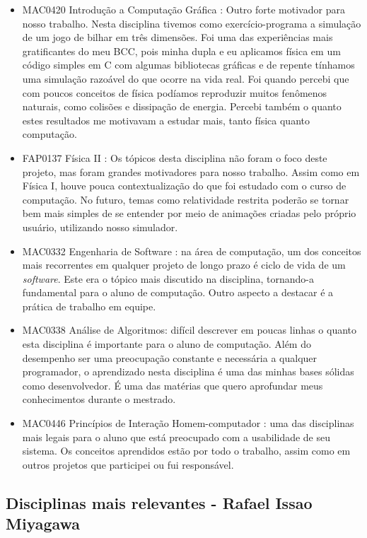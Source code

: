 \begin{itemize}
\item MAC0420 	Introdução a Computação Gráfica : Outro forte motivador para nosso trabalho. Nesta disciplina tivemos como exercício-programa a simulação de um jogo de bilhar em três dimensões. Foi uma das experiências mais gratificantes do meu BCC, pois minha dupla e eu aplicamos física em um código simples em C com algumas bibliotecas gráficas e de repente tínhamos uma simulação razoável do que ocorre na vida real. Foi quando percebi que com poucos conceitos de física podíamos reproduzir muitos fenômenos naturais, como colisões e dissipação de energia. Percebi também o quanto estes resultados me motivavam a estudar mais, tanto física quanto computação.

\item FAP0137 	Física II : Os tópicos desta disciplina não foram o foco deste projeto, mas foram grandes motivadores para nosso trabalho. Assim como em Física I, houve pouca contextualização do que foi estudado com o curso de computação. No futuro, temas como relatividade restrita poderão se tornar bem mais simples de se entender por meio de animações criadas pelo próprio usuário, utilizando nosso simulador.
 
\item MAC0332 	Engenharia de Software : na área de computação, um dos conceitos mais recorrentes em qualquer projeto de longo prazo é ciclo de vida de um \textit{software}. Este era o tópico mais discutido na disciplina, tornando-a fundamental para o aluno de computação. Outro aspecto a destacar é a prática de trabalho em equipe.

\item MAC0338 	Análise de Algoritmos: difícil descrever em poucas linhas o quanto esta disciplina é importante para o aluno de computação. Além do desempenho ser uma preocupação constante e necessária a qualquer programador, o aprendizado nesta disciplina é uma das minhas bases sólidas como desenvolvedor. É uma das matérias que quero aprofundar meus conhecimentos durante o mestrado.

\item MAC0446 	Princípios de Interação Homem-computador : uma das disciplinas mais legais para o aluno que está preocupado com a usabilidade de seu sistema. Os conceitos aprendidos estão por todo o trabalho, assim como em outros projetos que participei ou fui responsável.

\end{itemize}

\subsection{Disciplinas mais relevantes - Rafael Issao Miyagawa}

